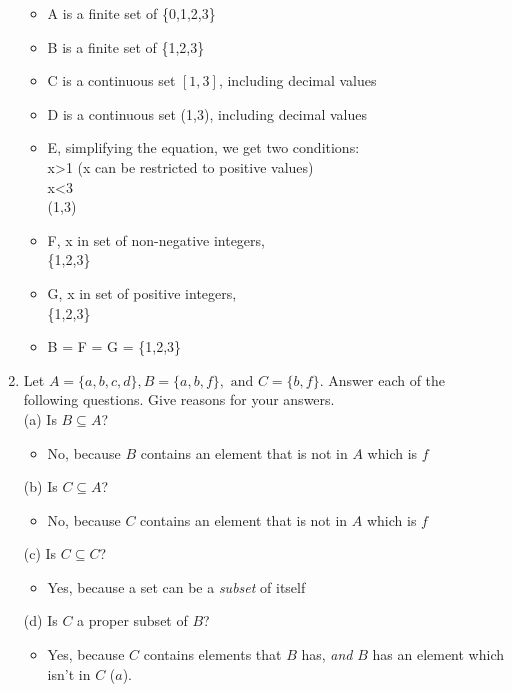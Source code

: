 \documentclass[english,12pt,legalpaper]{article}
\begin{document}
\begin{enumerate}
	\begin{itemize}
		\item A is a finite set of \{0,1,2,3\}
		\item B is a finite set of \{1,2,3\}
		\item C is a continuous set $[1,3]$, including decimal values
		\item D is a continuous set (1,3), including decimal values
		\item E, simplifying the equation, we get two conditions:
		\\ x>1 (x can be restricted to positive values)
		\\ x<3
		\\ (1,3)
		\item F, x in set of non-negative integers,
		\\ \{1,2,3\}
		\item G, x in set of positive integers, 
		\\ \{1,2,3\}
		\item B = F = G = \{1,2,3\}
	\end{itemize}
	
	
	\item Let $A = \{a, b, c, d\}, B = \{a, b, f \}, \text{ and } C = \{b, f\}.$ Answer each of the following questions. Give reasons for your answers. \\
	(a) Is $B \subseteq A$? 
	\begin{itemize}
		\item No, because $B$ contains an element that is not in $A$ which is $f$
	\end{itemize}
	(b) Is $C \subseteq A$?  
	\begin{itemize}
		\item No, because $C$ contains an element that is not in $A$ which is $f$
	\end{itemize}
	(c) Is $C \subseteq C$?
		\begin{itemize}
			\item Yes, because a set can be a \textit{subset} of itself 
		\end{itemize}
	(d) Is $C$ a proper subset of $B$?
	
	\begin{itemize}
		\item Yes, because $C$ contains  elements that $B$ has, \textit{and} $B$ has an element which isn't in $C$ ($a$).
	\end{itemize}
	

\end{enumerate}
\end{document}
